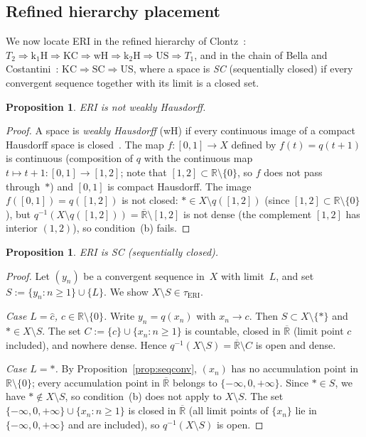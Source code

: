 \documentclass[11pt]{article}
\newtheorem{proposition}[theorem]{Proposition}
\theoremstyle{definition}
\theoremstyle{remark}
\begin{document}
\subsection{Refined hierarchy placement}\label{sec:position}

We now locate ERI in the refined hierarchy of
Clontz~\cite{bib:clontz}:
$T_2 \Rightarrow \mathrm{k_1H} \Rightarrow \mathrm{KC}
\Rightarrow \mathrm{wH} \Rightarrow \mathrm{k_2H}
\Rightarrow \mathrm{US} \Rightarrow T_1$,
and in the chain of Bella and
Costantini~\cite{bib:bella}: $\mathrm{KC} \Rightarrow \mathrm{SC}
\Rightarrow \mathrm{US}$, where a space is \emph{SC} (sequentially
closed) if every convergent sequence together with its limit is a
closed set.

\begin{proposition}\label{prop:notwH}
ERI is not weakly Hausdorff.
\end{proposition}
\begin{proof}
A space is \emph{weakly Hausdorff} (wH) if every continuous image of a
compact Hausdorff space is closed~\cite{bib:clontz}.
The map $f\colon [0,1] \to X$ defined by $f(t) = q(t+1)$ is continuous
(composition of $q$ with the continuous map $t \mapsto t+1\colon [0,1] \to [1,2]$;
note that $[1,2] \subset \mathbb{R}\setminus\{0\}$, so $f$ does not
pass through~$\ast$) and $[0,1]$ is compact
Hausdorff.
The image $f([0,1]) = q([1,2])$ is not closed:
$\ast \in X \setminus q([1,2])$ (since $[1,2] \subset
\mathbb{R}\setminus\{0\}$), but
$q^{-1}(X \setminus q([1,2])) = \overline{\mathbb{R}} \setminus [1,2]$
is not dense (the complement $[1,2]$ has interior $(1,2)$), so
condition~(b) fails.
\end{proof}

\begin{proposition}\label{prop:SC}
ERI is SC \textup{(sequentially closed)}.
\end{proposition}
\begin{proof}
Let $(y_n)$ be a convergent sequence in~$X$ with limit~$L$, and set
$S := \{y_n : n \ge 1\} \cup \{L\}$.
We show $X \setminus S \in \tau_{\mathrm{ERI}}$.

\emph{Case $L = \hat{c}$, $c \in \mathbb{R}\setminus\{0\}$.}\;
Write $y_n = q(x_n)$ with $x_n \to c$.
Then $S \subset X \setminus \{\ast\}$
and $\ast \in X \setminus S$.
The set $C := \{c\} \cup \{x_n : n \ge 1\}$ is countable, closed in
$\overline{\mathbb{R}}$ (limit point $c$ included), and nowhere dense.
Hence $q^{-1}(X \setminus S) = \overline{\mathbb{R}} \setminus C$
is open and dense.

\emph{Case $L = \ast$.}\;
By Proposition~\ref{prop:seqconv}, $(x_n)$ has no accumulation point
in $\mathbb{R}\setminus\{0\}$; every accumulation point in
$\overline{\mathbb{R}}$ belongs to $\{-\infty, 0, +\infty\}$.
Since $\ast \in S$, we have $\ast \notin X \setminus S$, so
condition~(b) does not apply to $X \setminus S$.
The set $\{-\infty, 0, +\infty\} \cup \{x_n : n \ge 1\}$ is closed
in $\overline{\mathbb{R}}$ (all limit points of $\{x_n\}$ lie
in $\{-\infty, 0, +\infty\}$ and are included), so
$q^{-1}(X \setminus S)$ is open.
\end{proof}
\end{document}
